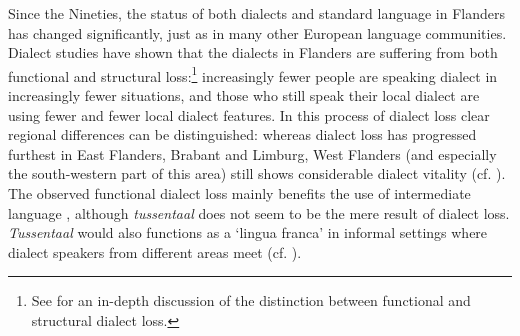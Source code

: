 \documentclass[output=paper]{LSP/langsci}
\begin{document}
Since the Nineties, the status of both dialects and standard language in Flanders has changed significantly, just as in many other European language communities. Dialect studies have shown that the dialects in Flanders are suffering from both functional \citep{ghyselen_dialectcompetentie_2014} and structural \citep{heeringa_convergence_2014,vandekerckhove_structurele_2000} loss:\footnote{See \citet{ghyselen_dialectcompetentie_2014} for an in-depth discussion of the distinction between functional and structural dialect loss.} increasingly fewer people are speaking dialect in increasingly fewer situations, and those who still speak their local dialect are using fewer and fewer local dialect features. In this process of dialect loss clear regional differences can be distinguished: whereas dialect loss has progressed furthest in East Flanders, Brabant and Limburg, West Flanders (and especially the south-western part of this area) still shows considerable dialect vitality (cf. \citealt{ghyselen_dialectcompetentie_2014}). The observed functional dialect loss mainly benefits the use of intermediate language \citep{de_caluwe_tussentaal_2006}, although \textit{tussentaal} does not seem to be the mere result of dialect loss. \textit{Tussentaal} would also functions as a ‘lingua franca’ in informal settings where dialect speakers from different areas meet (cf. \citealt{gabel_taalaccommodatie_2010}). 
\end{document}
